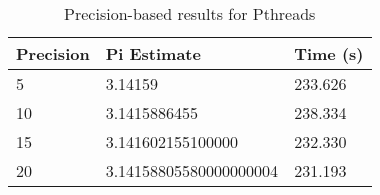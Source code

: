 \begin{table}[H]
\centering
\caption{Precision-based results for Pthreads}
\label{tab:pthreads-precision}
\begin{tabular}{|l|l|l|}
\hline
Precision & Pi Estimate & Time (s) \\
\hline
5 & 3.14159 & 233.626 \\
10 & 3.1415886455 & 238.334 \\
15 & 3.141602155100000 & 232.330 \\
20 & 3.14158805580000000004 & 231.193 \\
\hline
\end{tabular}
\end{table}
